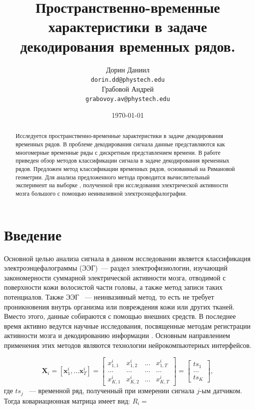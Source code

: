 \documentclass[a4paper, 12pt]{extarticle}
\title{Пространственно-временные характеристики в задаче декодирования временных рядов.}
\author{
	Дорин Даниил \\
	\texttt{dorin.dd@phystech.edu} \\
	\And
	Грабовой Андрей \\
	\texttt{grabovoy.av@phystech.edu}
}
\date{\today}
\begin{document}
\maketitle

\begin{abstract}

	Исследуется пространственно-временные характеристики в задаче декодирования временных рядов. В проблеме декодирования 
	сигнала данные представляются как многомерные временные ряды с дискретным представлением времени. 
	В работе приведен обзор методов классификации сигнала в задаче декодирования временных рядов.
    Предложен метод классификации временных рядов, основанный на Римановой геометрии.
	Для анализа предложенного метода проводится вычислительный эксперимент на
	выборке \citep{misc_eeg_eye_state_264}, полученной при исследования электрической активности мозга большого с помощью неинвазивной электроэнцефалографии.

\end{abstract}


\section{Введение}
Основной целью анализа сигнала в данном исследовании является 
классификация электроэнцефалограммы (ЭЭГ)\citep{teplan2002fundamentals, beniczky2020electroencephalography}~--- раздел электрофизиологии, 
изучающий закономерности суммарной электрической активности мозга, 
отводимой с поверхности кожи волосистой части головы, 
а также метод записи таких потенциалов. Также ЭЭГ ~--- неинвазивный метод, то есть 
не требует проникновения внутрь организма или повреждения кожи или других тканей. 
Вместо этого, данные собираются с помощью внешних средств. 
В последнее время активно ведутся научные исследования, 
посвященные методам регистрации активности мозга и декодированию 
информации \citep{siuly2016eeg, craik2019deep}. Основным направлением применения 
этих методов являются технологии нейрокомпьютерных интерфейсов.

\begin{equation*}
	\bm{X}_i= \left[\bm{x}^i_1,\dots \bm{x}^i_{T}\right] = 
	\begin{bmatrix}
	x^i_{1,1} & x^i_{1,2} &  \dots  &  x^i_{1,T}\\
	\dots & \dots &  \dots  &  \dots\\
	x^i_{K,1} & x^i_{K,2} &  \dots  &  x^i_{K,T}
	\end{bmatrix}
	= \begin{bmatrix}
		ts_1\\
		\dots\\
		ts_K
		\end{bmatrix},
	\end{equation*}
где $ts_j$ ~--- временной ряд, полученный при измерении сигнала $j$-ым датчиком.
Тогда ковариационная матрица имеет вид:
$R_i = $
\end{document}

